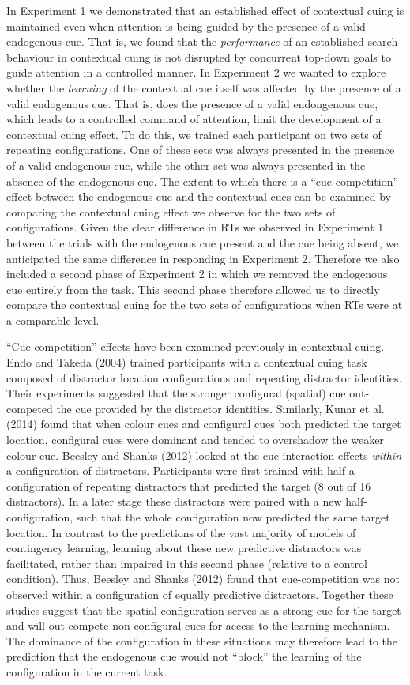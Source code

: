 \documentclass[
  man,
  floatsintext,
  longtable,
  nolmodern,
  notxfonts,
  notimes,
  colorlinks=true,linkcolor=blue,citecolor=blue,urlcolor=blue]{apa7}
\begin{document}
In Experiment 1 we demonstrated that an established effect of contextual
cuing is maintained even when attention is being guided by the presence
of a valid endogenous cue. That is, we found that the \emph{performance}
of an established search behaviour in contextual cuing is not disrupted
by concurrent top-down goals to guide attention in a controlled manner.
In Experiment 2 we wanted to explore whether the \emph{learning} of the
contextual cue itself was affected by the presence of a valid endogenous
cue. That is, does the presence of a valid endongenous cue, which leads
to a controlled command of attention, limit the development of a
contextual cuing effect. To do this, we trained each participant on two
sets of repeating configurations. One of these sets was always presented
in the presence of a valid endogenous cue, while the other set was
always presented in the absence of the endogenous cue. The extent to
which there is a ``cue-competition'' effect between the endogenous cue
and the contextual cues can be examined by comparing the contextual
cuing effect we observe for the two sets of configurations. Given the
clear difference in RTs we observed in Experiment 1 between the trials
with the endogenous cue present and the cue being absent, we anticipated
the same difference in responding in Experiment 2. Therefore we also
included a second phase of Experiment 2 in which we removed the
endogenous cue entirely from the task. This second phase therefore
allowed us to directly compare the contextual cuing for the two sets of
configurations when RTs were at a comparable level.

``Cue-competition'' effects have been examined previously in contextual
cuing. Endo and Takeda (2004) trained participants with a contextual
cuing task composed of distractor location configurations and repeating
distractor identities. Their experiments suggested that the stronger
configural (spatial) cue out-competed the cue provided by the distractor
identities. Similarly, Kunar et al. (2014) found that when colour cues
and configural cues both predicted the target location, configural cues
were dominant and tended to overshadow the weaker colour cue. Beesley
and Shanks (2012) looked at the cue-interaction effects \emph{within} a
configuration of distractors. Participants were first trained with half
a configuration of repeating distractors that predicted the target (8
out of 16 distractors). In a later stage these distractors were paired
with a new half-configuration, such that the whole configuration now
predicted the same target location. In contrast to the predictions of
the vast majority of models of contingency learning, learning about
these new predictive distractors was facilitated, rather than impaired
in this second phase (relative to a control condition). Thus, Beesley
and Shanks (2012) found that cue-competition was not observed within a
configuration of equally predictive distractors. Together these studies
suggest that the spatial configuration serves as a strong cue for the
target and will out-compete non-configural cues for access to the
learning mechanism. The dominance of the configuration in these
situations may therefore lead to the prediction that the endogenous cue
would not ``block'' the learning of the configuration in the current
task.
\end{document}
